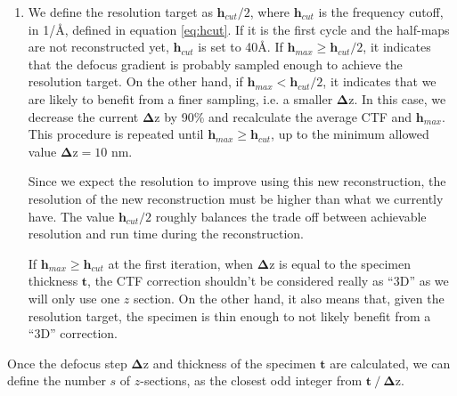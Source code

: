 \begin{enumerate}
    \item We define the resolution target as $\bm{h}_{cut}/2$, where $\bm{h}_{cut}$ is the frequency cutoff, in 1/\r{A}, defined in equation \ref{eq:hcut}. If it is the first cycle and the half-maps are not reconstructed yet, $\bm{h}_{cut}$ is set to 40\r{A}. If $\bm{h}_{max} \geqslant \bm{h}_{cut}/2$, it indicates that the defocus gradient is probably sampled enough to achieve the resolution target. On the other hand, if $\bm{h}_{max} < \bm{h}_{cut}/2$, it indicates that we are likely to benefit from a finer sampling, i.e. a smaller $\bm{\Delta \mathrm{z}}$. In this case, we decrease the current $\bm{\Delta \mathrm{z}}$ by 90\% and recalculate the average CTF and $\bm{h}_{max}$. This procedure is repeated until $\bm{h}_{max} \geqslant \bm{h}_{cut}$, up to the minimum allowed value $\bm{\Delta \mathrm{z}} = 10$ nm.
    \begin{note}Since we expect the resolution to improve using this new reconstruction, the resolution of the new reconstruction must be higher than what we currently have. The value $\bm{h}_{cut}/2$ roughly balances the trade off between achievable resolution and run time during the reconstruction.
    \end{note}
    
    \begin{note}If $\bm{h}_{max} \geqslant \bm{h}_{cut}$ at the first iteration, when $\bm{\Delta \mathrm{z}}$ is equal to the specimen thickness $\bm{t}$, the CTF correction shouldn't be considered really as ``3D'' as we will only use one $z$ section. On the other hand, it also means that, given the resolution target, the specimen is thin enough to not likely benefit from a ``3D'' correction.
    \end{note}
\end{enumerate}

Once the defocus step $\bm{\Delta \mathrm{z}}$ and thickness of the specimen $\bm{t}$ are calculated, we can define the number $s$ of $z$-sections, as the closest odd integer from $\bm{t}\ /\ \bm{\Delta \mathrm{z}}$.



